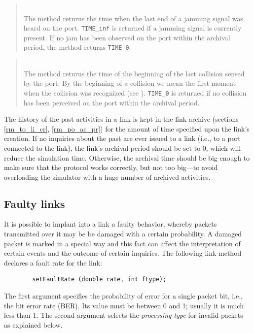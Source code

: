 \begin{quote}
\noindent{}\\ \hspace{0in}
The method returns the time when the last end of a jamming signal was
heard on the port. {\tt TIME\_inf} is returned if a
jamming signal is currently present.
If no jam has been observed on the port
within the archival period, the method returns {\tt TIME\_0}.
\end{quote}

\begin{quote}
\noindent{}\\ \hspace{0in}
The method returns the time of the beginning of the last collision sensed
by the port. By the beginning of a collision we mean
the first moment when the collision was recognized
(see ).
{\tt TIME\_0} is returned if
no collision has been perceived on the port within the archival period.
\end{quote}\medskip

The history of the past activities in a link is kept in the link archive
(sections \ref{rm_to_li_cr}, \ref{rm_po_ac_pr}) for the amount of time
specified upon the link's creation.
If no inquiries about the past 
are ever issued to a link (i.e., to a port connected
to the link), the link's archival period should be set to 0, which will
reduce the simulation time.
Otherwise, the archival time should be big enough to make sure that the
protocol works correctly, but not too big---to avoid overloading the
simulator with a huge number of archived activities.

\subsection{Faulty links}
\label{rm_po_fl}

It is possible to implant into a link a faulty behavior, whereby packets
transmitted over it may be be damaged with a certain probability.
A damaged packet is marked in a special way and this fact can affect the
interpretation of certain events and the outcome of certain inquiries.
The following link method declares a fault rate for the link:
\begin{verbatim}
        setFaultRate (double rate, int ftype);
\end{verbatim}
The first argument specifies the probability of error for a single packet bit,
i.e., the bit error rate (BER).
Its value must be between 0 and 1; usually it is much less than 1.
The second argument selects the {\em processing type\/} for invalid
packets---as explained below.

